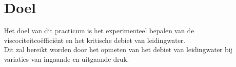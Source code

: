 \section{Doel}

Het doel van dit practicum is het experimenteel bepalen van de viscociteitco\"effici\"ent 
en het kritische debiet van leidingwater. \\

Dit zal bereikt worden door het opmeten van het debiet van 
leidingwater bij variaties van ingaande en uitgaande 
druk. 
